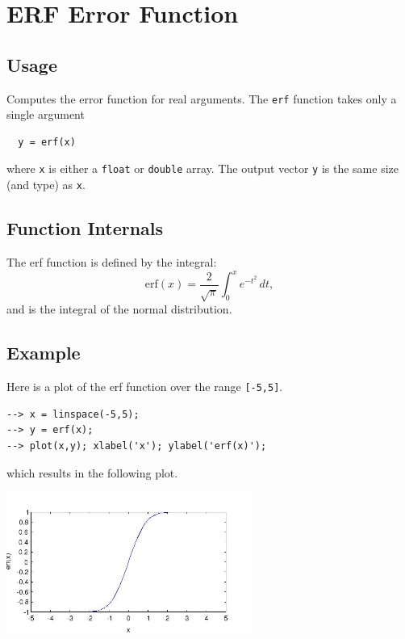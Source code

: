 \section{ERF Error Function}

\subsection{Usage}

Computes the error function for real arguments.  The \verb|erf|
function takes only a single argument
\begin{verbatim}
  y = erf(x)
\end{verbatim}
where \verb|x| is either a \verb|float| or \verb|double| array.  The output
vector \verb|y| is the same size (and type) as \verb|x|.
\subsection{Function Internals}

The erf function is defined by the integral:
\[
  \mathrm{erf}(x) = \frac{2}{\sqrt{\pi}}\int_{0}^{x} e^{-t^2} \, dt,
\]
and is the integral of the normal distribution.
\subsection{Example}

Here is a plot of the erf function over the range \verb|[-5,5]|.
\begin{verbatim}
--> x = linspace(-5,5);
--> y = erf(x);
--> plot(x,y); xlabel('x'); ylabel('erf(x)');
\end{verbatim}
which results in the following plot.


\centerline{\includegraphics[width=8cm]{erf1}}

